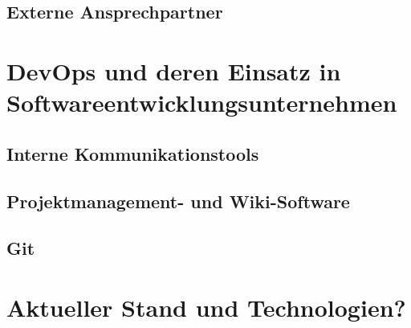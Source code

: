 \subsection{Externe Ansprechpartner}

\section{DevOps und deren Einsatz in Softwareentwicklungsunternehmen}

\subsection{Interne Kommunikationstools}

\subsection{Projektmanagement- und Wiki-Software}

\subsection{Git}

\section{Aktueller Stand und Technologien?}